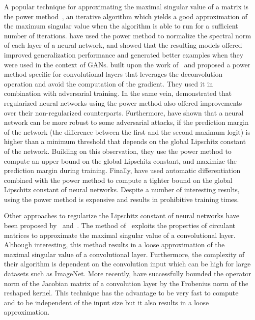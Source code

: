 A popular technique for approximating the maximal singular value of a matrix is the power method~\cite{golub2000eigenvalue}, an iterative algorithm which yields a good approximation of the maximum singular value when the algorithm is able to run for a sufficient number of iterations. 
\citet{yoshida2017spectral, miyato2018spectral} have used the power method to normalize the spectral norm of each layer of a neural network, and showed that the resulting models offered improved generalization performance and generated better examples when they were used in the context of GANs. 
\citet{farnia2018generalizable} built upon the work of~\citet{miyato2018spectral} and proposed a power method specific for convolutional layers that leverages the deconvolution operation and avoid the computation of the gradient.
They used it in combination with adversarial training. 
In the same vein, \citet{gouk2018regularisation} demonstrated that regularized neural networks using the power method also offered improvements over their non-regularized counterparts. 
Furthermore, \citet{tsuzuku2018lipschitz} have shown that a neural network can be more robust to some adversarial attacks, if the prediction margin of the network (\ie the difference between the first and the second maximum logit) is higher than a minimum threshold that depends on the global Lipschitz constant of the network.
Building on this observation, they use the power method to compute an upper bound on the global Lipschitz constant, and maximize the prediction margin during training.
Finally, \citet{scaman2018lipschitz} have used automatic differentiation combined with the power method to compute a tighter bound on the global Lipschitz constant of neural networks.
Despite a number of interesting results, using the power method is expensive and results in prohibitive training times. 

Other approaches to regularize the Lipschitz constant of neural networks have been proposed by~\citet{sedghi2018iclr} and~\citet{singla2019bounding}.
The method of~\citet{sedghi2018iclr} exploits the properties of circulant matrices to approximate the maximal singular value of a convolutional layer.
Although interesting, this method results in a loose approximation of the maximal singular value of a convolutional layer.
Furthermore, the complexity of their algorithm is dependent on the convolution input which can be high for large datasets such as ImageNet.
More recently, \citet{singla2019bounding} have successfully bounded the operator norm of the Jacobian matrix of a convolution layer by the Frobenius norm of the reshaped kernel.
This technique has the advantage to be very fast to compute and to be independent of the input size but it also results in a loose approximation. 

